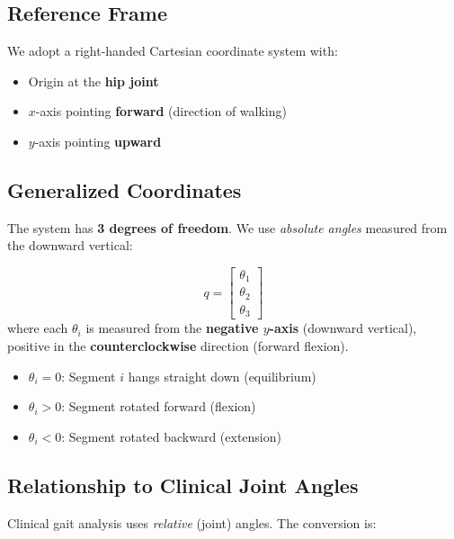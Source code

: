 \documentclass[11pt,a4paper]{article}
\newcommand{\vc}[1]{\bm{#1}}
\def\vc#1{#1}%
\def\bm#1{#1}%
\begin{document}
\subsection{Reference Frame}

We adopt a right-handed Cartesian coordinate system with:
\begin{itemize}
    \item Origin at the \textbf{hip joint}
    \item $x$-axis pointing \textbf{forward} (direction of walking)
    \item $y$-axis pointing \textbf{upward}
\end{itemize}

\subsection{Generalized Coordinates}

The system has \textbf{3 degrees of freedom}. We use \textit{absolute angles}
measured from the downward vertical:

\begin{keybox}
\begin{equation}
    \vc{q} = \begin{bmatrix} \theta_1 \\ \theta_2 \\ \theta_3 \end{bmatrix}
    \label{eq:gen_coords}
\end{equation}
where each $\theta_i$ is measured from the \textbf{negative $y$-axis}
(downward vertical), positive in the \textbf{counterclockwise} direction
(forward flexion).
\begin{itemize}
    \item $\theta_i = 0$: Segment $i$ hangs straight down (equilibrium)
    \item $\theta_i > 0$: Segment rotated forward (flexion)
    \item $\theta_i < 0$: Segment rotated backward (extension)
\end{itemize}
\end{keybox}

\subsection{Relationship to Clinical Joint Angles}

Clinical gait analysis uses \textit{relative} (joint) angles. The conversion is:
\end{document}
